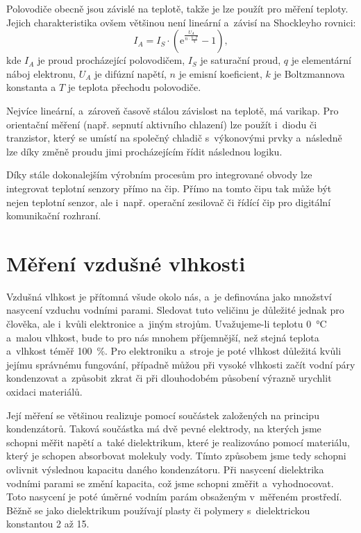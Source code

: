 Polovodiče obecně jsou závislé na teplotě, takže je lze použít pro měření teploty. Jejich charakteristika ovšem většinou není lineární a~závisí na Shockleyho rovnici:
\begin{equation}
    I_A =I_S \cdot (\mathrm{e} ^{\frac{U_A}{n \cdot \frac{k \cdot T}{q}}} - 1),
    \label{eq_Shockley}
\end{equation}
kde $I_{A}$ je proud procházející polovodičem, $I_{S}$ je saturační proud, $q$ je elementární náboj elektronu, $U_{A}$ je difúzní napětí, $n$ je emisní koeficient, $k$ je Boltzmannova konstanta a $T$ je teplota přechodu polovodiče.

Nejvíce lineární, a~zároveň časově stálou závislost na teplotě, má varikap. Pro orientační měření (např. sepnutí aktivního chlazení) lze použít i~diodu či tranzistor, který se umístí na společný chladič s~výkonovými prvky a~následně lze díky změně proudu jimi procházejícím řídit následnou logiku.

Díky stále dokonalejším výrobním procesům pro integrované obvody lze integrovat teplotní senzory přímo na čip. Přímo na tomto čipu tak může být nejen teplotní senzor, ale i~např. operační zesilovač či řídící čip pro digitální komunikační rozhraní.

\section{Měření vzdušné vlhkosti}

Vzdušná vlhkost je přítomná všude okolo nás, a~je definována jako množství nasycení vzduchu vodními parami. Sledovat tuto veličinu je důležité jednak pro člověka, ale i~kvůli elektronice a~jiným strojům. Uvažujeme-li teplotu \SI{0}{\celsius} a~malou vlhkost, bude to pro nás mnohem příjemnější, než stejná teplota a~vlhkost téměř \SI{100}{\percent}. Pro elektroniku a~stroje je poté vlhkost důležitá kvůli jejímu správnému fungování, případně můžou při vysoké vlhkosti začít vodní páry kondenzovat a~způsobit zkrat či při dlouhodobém působení výrazně urychlit oxidaci materiálů.

Její měření se většinou realizuje pomocí součástek založených na principu kondenzátorů. Taková součástka má dvě pevné elektrody, na kterých jsme schopni měřit napětí a~také dielektrikum, které je realizováno pomocí materiálu, který je schopen absorbovat molekuly vody. Tímto způsobem jsme tedy schopni ovlivnit výslednou kapacitu daného kondenzátoru. Při nasycení dielektrika vodními parami se změní kapacita, což jsme schopni změřit a~vyhodnocovat. Toto nasycení je poté úměrné vodním parám obsaženým v~měřeném prostředí. Běžně se jako dielektrikum používají plasty či polymery s~dielektrickou konstantou 2 až 15.

